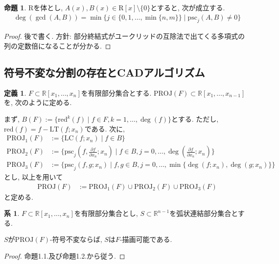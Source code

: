 \documentclass[dvipdfmx,uplatex]{jsarticle}
\newcommand{\R}{\mathbb{R}}
\newcommand{\psc}{\mathrm{psc}}
\newcommand{\PROJ}{\mathrm{PROJ}}
\theoremstyle{definition}
\newtheorem{definition}{定義}[section]
\newtheorem{proposition}{命題}[section]
\newtheorem{corollary}{系}[section]
\begin{document}
\begin{proposition}
$\mathrm{R}$を体とし, $A(x), B(x) \in \mathrm{R}[x] \setminus \{0\}$とすると, 次が成立する.
\begin{align*}
\deg(\gcd(A, B)) = \min \{ j  \in \{0,1, \dots, \min\{n,m\}\}\mid \psc_j(A,B) \neq 0\}
\end{align*}
\end{proposition}

\begin{proof}
後で書く.
方針: 部分終結式がユークリッドの互除法で出てくる多項式の列の定数倍になることが分かる.


\end{proof}


\subsection{符号不変な分割の存在とCADアルゴリズム}
\begin{definition}
$F \subset \R[x_1, \dots, x_n]$を有限部分集合とする. $\PROJ(F) \subset \R[x_1, \dots, x_{n-1}]$を, 次のように定める.

まず,  $B(F) := \{ \mathrm{red}^k(f) \mid f \in F, k=1, \dots, \deg(f) \}$とする. ただし, $\mathrm{red}(f) = f - \mathrm{LT}(f; x_n)$である.
次に, 
\begin{align*}
	\PROJ_1(F) &:= \{\mathrm{LC}(f;x_n) \mid f \in B\}\\
	\PROJ_2(F) &:= \{\psc_j(f, \frac{\partial f}{\partial x_n}; x_n) \mid f \in B, j =0, \dots, \deg(\frac{\partial f}{\partial x_n};x_n) \}\\
	\PROJ_3(F) &:= \{\psc_j(f,g;x_n) \mid f,g \in B, j = 0, \dots, \min\{\deg(f;x_n), \deg(g;x_n)\}\}
\end{align*}
とし, 以上を用いて
\begin{align*}
	\PROJ(F) &:= \PROJ_1(F) \cup \PROJ_2(F) \cup \PROJ_3(F)
\end{align*}
と定める.
\end{definition}
\begin{corollary}
$F \subset \R[x_1, \dots, x_n]$を有限部分集合とし, $S \subset \R^{n-1}$を弧状連結部分集合とする.

$S$が$\PROJ(F)$-符号不変ならば, $S$は$F$-描画可能である.
\end{corollary}

\begin{proof}
命題1.1.及び命題1.2.から従う.
\end{proof}
\end{document}
